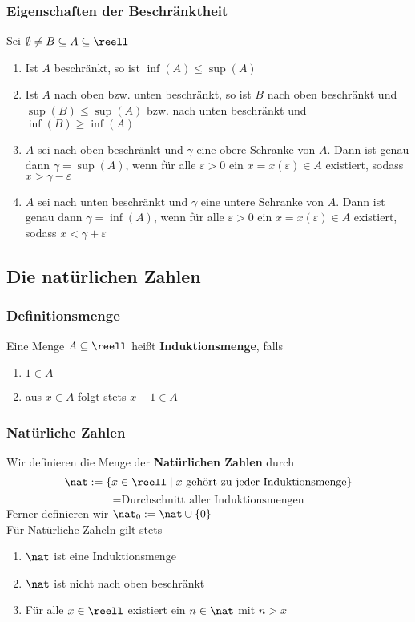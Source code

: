 \documentclass{kit}
\begin{document}
    \subsubsection{Eigenschaften der Beschränktheit}
      Sei $\emptyset\neq B\subseteq A\subseteq\reell$\\
      \begin{enumerate}[label=\arabic*)]
        \item Ist $A$ beschränkt, so ist $\inf(A)\le\sup(A)$
        \item Ist $A$ nach oben bzw. unten beschränkt, so ist $B$ nach oben beschränkt und $\sup(B)\le\sup(A)$ bzw. nach unten beschränkt und $\inf(B)\ge\inf(A)$
        \item $A$ sei nach oben beschränkt und $\gamma$ eine obere Schranke von $A$. Dann ist genau dann $\gamma=\sup(A)$, wenn für alle $\varepsilon>0$ ein $x=x(\varepsilon)\in A$ existiert, sodass $x>\gamma-\varepsilon$
        \item $A$ sei nach unten beschränkt und $\gamma$ eine untere Schranke von $A$. Dann ist genau dann $\gamma=\inf(A)$, wenn für alle $\varepsilon>0$ ein $x=x(\varepsilon)\in A$ existiert, sodass $x<\gamma+\varepsilon$
      \end{enumerate}
\pagebreak
  \subsection{Die natürlichen Zahlen}
    \subsubsection{Definitionsmenge}
      Eine Menge $A\subseteq\reell$ heißt \textbf{Induktionsmenge}, falls
      \begin{enumerate}
        \item $1\in A$
        \item aus $x\in A$ folgt stets $x+1\in A$
      \end{enumerate}
    \subsubsection{Natürliche Zahlen}
      Wir definieren die Menge der \textbf{Natürlichen Zahlen} durch
      $$\nat:=\{x\in\reell\mid x\text{ gehört zu jeder Induktionsmenge}\}$$
      $$= \text{Durchschnitt aller Induktionsmengen}$$
      Ferner definieren wir $\nat_0:=\nat\cup\{0\}$\\
      Für Natürliche Zaheln gilt stets
      \begin{enumerate}
        \item $\nat$ ist eine Induktionsmenge
        \item $\nat$ ist nicht nach oben beschränkt
        \item Für alle $x\in\reell$ existiert ein $n\in\nat$ mit $n>x$
      \end{enumerate}
\end{document}

